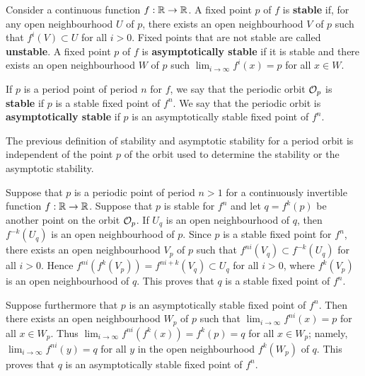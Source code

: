 \begin{defn}
Consider a continuous function $f:\mathbb{R} \rightarrow \mathbb{R}$.
A fixed point $p$ of $f$ is {\bfseries stable} if, for any open
neighbourhood $U$ of $p$, there exists an open neighbourhood $V$ of $p$
such that $f^i(V) \subset U$ for all $i > 0$.  Fixed points that are
not stable are called {\bfseries unstable}.   A fixed
point $p$ of
$f$ is {\bfseries asymptotically stable} if it is
stable and there exists an open neighbourhood $W$ of $p$ such
$\displaystyle \lim_{i\rightarrow \infty} f^{i}(x) = p$ for all
$x\in W$.

If $p$ is a period point of period $n$ for $f$, we say that the
periodic orbit $\mathcal{O}_p$ is {\bfseries stable} if $p$ is a stable
fixed point of $f^n$.  We say that the periodic orbit is
{\bfseries asymptotically stable} if $p$
is an asymptotically stable fixed point of $f^n$.
\end{defn}

\begin{rmk}
The previous definition of stability and asymptotic stability for a
period orbit is independent of the point $p$ of the orbit used to
determine the stability or the asymptotic stability.

Suppose that $p$ is a periodic point of period $n>1$ for a continuously
invertible function $f:\mathbb{R}\to \mathbb{R}$.  Suppose that $p$ is stable
for $f^n$ and let $q=f^k(p)$ be another point on the orbit $\mathcal{O}_p$.
If $U_q$ is an open neighbourhood of $q$, then $f^{-k}(U_q)$ is an
open neighbourhood of $p$.  Since $p$ is a stable fixed point for
$f^n$, there exists an open neighbourhood $V_p$ of $p$ such that
$f^{ni}(V_q) \subset f^{-k}(U_q)$ for all $i>0$. 
Hence $f^{ni}(f^k(V_p)) = f^{ni+k}(V_q) \subset U_q$ for all $i>0$,
where $f^k(V_p)$ is an open neighbourhood of $q$.  This proves that
$q$ is a stable fixed point of $f^n$.

Suppose furthermore that $p$ is an asymptotically stable fixed point
of $f^n$.  Then there exists an open neighbourhood $W_p$ of $p$ such
that $\displaystyle \lim_{i\to \infty}f^{ni}(x) = p$ for all $x \in W_p$.
Thus $\displaystyle \lim_{i\to \infty}f^{ni}(f^k(x)) = f^{k}(p) = q$
for all $x \in W_p$; namely,
$\displaystyle \lim_{i\to \infty}f^{ni}(y) = q$ for all
$y$ in the open neighbourhood $f^k(W_p)$ of $q$.  This proves that
$q$ is an asymptotically stable fixed point of $f^n$.
\end{rmk}

